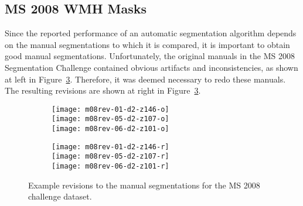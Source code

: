 \subsection{MS 2008 WMH Masks}\label{ss:m08-rev}
Since the reported performance of an automatic segmentation algorithm depends on
the manual segmentations to which it is compared,
it is important to obtain good manual segmentations.
Unfortunately, the original manuals in the MS 2008 Segmentation Challenge
contained obvious artifacts and inconsistencies,
as shown at left in Figure~\ref{fig:m08-rev}.
Therefore, it was deemed necessary to redo these manuals.
The resulting revisions are shown at right in Figure~\ref{fig:m08-rev}.
\begin{figure}
  \centering
  \begin{minipage}{6cm}
    \begin{subfigure}{\textwidth}
      \centering{}%
      \label{fig:m08-rev-o}
      \texttt{[image: m08rev-01-d2-z146-o]}\\[0.2em]
      \texttt{[image: m08rev-05-d2-z107-o]}\\[0.2em]
      \texttt{[image: m08rev-06-d2-z101-o]}
    \end{subfigure}
  \end{minipage}
  \begin{minipage}{6cm}
    \begin{subfigure}{\textwidth}
      \centering{}%
      \label{fig:m08-rev-r}
      \texttt{[image: m08rev-01-d2-z146-r]}%
      \makebox[0pt][r]{\textcolor{white}{\raisebox{0.5em}{ CHB 01 }}}\\[0.2em]
      \texttt{[image: m08rev-05-d2-z107-r]}%
      \makebox[0pt][r]{\textcolor{white}{\raisebox{0.5em}{ CHB 05 }}}\\[0.2em]
      \texttt{[image: m08rev-06-d2-z101-r]}%
      \makebox[0pt][r]{\textcolor{white}{\raisebox{0.5em}{CHB 06 }}}
    \end{subfigure}
  \end{minipage}
  \caption{Example revisions to the manual segmentations for the MS 2008 challenge dataset.}%
  \label{fig:m08-rev}
\end{figure}
